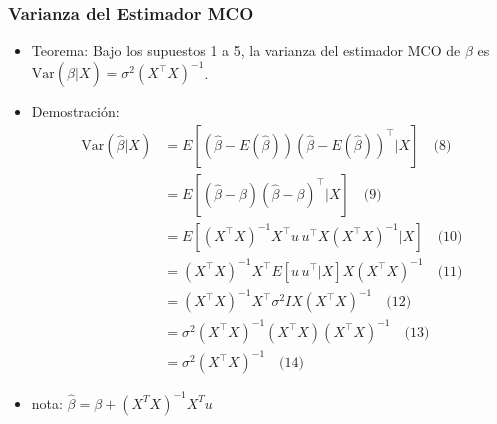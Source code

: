 \documentclass{beamer}
\begin{document}
\begin{frame}
\frametitle{Varianza del Estimador MCO}
\begin{itemize}
    \item Teorema: Bajo los supuestos 1 a 5, la varianza del estimador MCO de $\beta$ es $\text{Var}(\hat{\beta}|X) = \sigma^2(X^{\top}X)^{-1}$.
    \item Demostración:
    \begin{align*}
        \text{Var}(\hat{\beta}|X) &= E[(\hat{\beta} - E(\hat{\beta}))(\hat{\beta} - E(\hat{\beta}))^{\top}|X] \quad \text{(8)} \\
        &= E[(\hat{\beta} - \beta)(\hat{\beta} - \beta)^{\top}|X] \quad \text{(9)} \\
        &= E[(X^{\top}X)^{-1}X^{\top}u \, u^{\top}X(X^{\top}X)^{-1}|X] \quad \text{(10)} \\
        &= (X^{\top}X)^{-1}X^{\top}E[u \, u^{\top}|X]X(X^{\top}X)^{-1} \quad \text{(11)} \\
        &= (X^{\top}X)^{-1}X^{\top}\sigma^2IX(X^{\top}X)^{-1} \quad \text{(12)} \\
        &= \sigma^2(X^{\top}X)^{-1}(X^{\top}X)(X^{\top}X)^{-1} \quad \text{(13)} \\
        &= \sigma^2(X^{\top}X)^{-1} \quad \text{(14)}
    \end{align*}
    \item nota:  $\hat{\beta}=\beta+(X^{T}X)^{-1}X^{T}u$
\end{itemize}
\end{frame}
\end{document}
